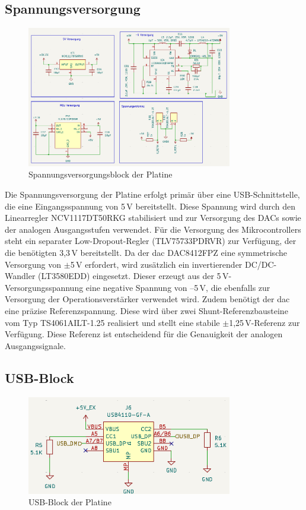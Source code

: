 \subsection{Spannungsversorgung}
\begin{figure}[H]
    \centering
    \includegraphics[width=0.8\textwidth]{bilder/Bipolar_Power.png}
    \caption{Spannungsversorgungsblock der Platine}
    \label{fig:spannungsversorgung}
\end{figure}

Die Spannungsversorgung der Platine erfolgt primär über eine USB-Schnittstelle, die eine Eingangsspannung von 5\,V bereitstellt. Diese Spannung wird durch den Linearregler NCV1117DT50RKG stabilisiert und zur Versorgung des DACs sowie der analogen Ausgangsstufen verwendet.
Für die Versorgung des Mikrocontrollers steht ein separater Low-Dropout-Regler (TLV75733PDRVR) zur Verfügung, der die benötigten 3{,}3\,V bereitstellt.
Da der \gls{dac} DAC8412FPZ eine symmetrische Versorgung von $\pm$5\,V erfordert, wird zusätzlich ein invertierender DC/DC-Wandler (LT3580EDD) eingesetzt. Dieser erzeugt aus der 5\,V-Versorgungsspannung eine negative Spannung von –5\,V, die ebenfalls zur Versorgung der Operationsverstärker verwendet wird.
Zudem benötigt der \gls{dac} eine präzise Referenzspannung. Diese wird über zwei Shunt-Referenzbausteine vom Typ TS4061AILT-1.25 realisiert und stellt eine stabile $\pm$1{,}25\,V-Referenz zur Verfügung. Diese Referenz ist entscheidend für die Genauigkeit der analogen Ausgangssignale.

\subsection{USB-Block}
\begin{figure}[H]
    \centering
    \includegraphics[width=0.8\textwidth]{bilder/USBC_Port.png}
    \caption{USB-Block der Platine}
    \label{fig:usb_block}
\end{figure}

